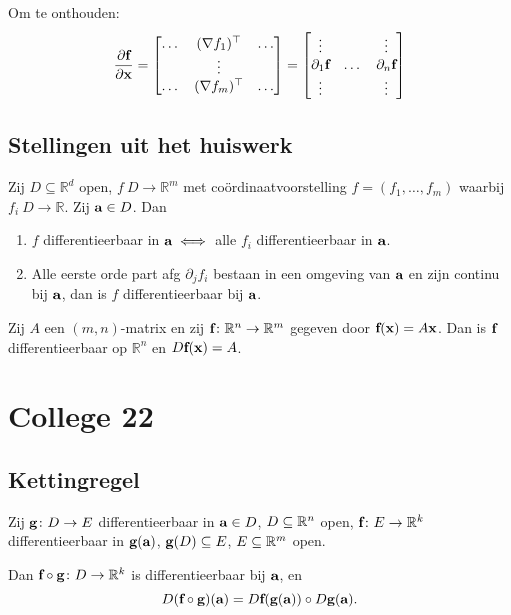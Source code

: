 \documentclass{2wa40summary}
\begin{document}
			Om te onthouden:
			\[ \frac{\partial {\textbf{f}}}{\partial {\textbf{x}}} = \begin{bmatrix}
			\dots & (\nabla f_1)^\top & \dots \\
			& \vdots & \\
			\dots & (\nabla f_m)^\top & \dots
			\end{bmatrix} =
			\begin{bmatrix}
			\vdots & & \vdots \\
			\partial_1 {\textbf{f}} & \dots & \partial_n {\textbf{f}} \\
			\vdots & & \vdots
			\end{bmatrix}\]
			
		\subsection{Stellingen uit het huiswerk}
			\theorem Zij $ D \subseteq \mathbb{R}^d $ open, $ f\:  D \to \mathbb{R}^m $ met co\"ordinaatvoorstelling $ f=(f_1,\dots,f_m) $ waarbij $ f_i \:  D \to \mathbb{R} $. Zij $ {\textbf{a}} \in D $. Dan
			\begin{enumerate}[(1)]
				\item $ f $ differentieerbaar in $ {\textbf{a}} \iff $ alle $ f_i $ differentieerbaar in $ {\textbf{a}} $.
				\item Alle eerste orde part afg $ \partial_j f_i $ bestaan in een omgeving van $ {\textbf{a}} $ en zijn continu bij $ {\textbf{a}} $, dan is $ f $ differentieerbaar bij $ {\textbf{a}} $.
			\end{enumerate}
			\theorem Zij $ A $ een $ (m,n) $-matrix en zij $ {\textbf{f}}\colon \mathbb{R}^n \to \mathbb{R}^m $ gegeven door $ {\textbf{f}}({\textbf{x}})=A{\textbf{x}} $. Dan is $ {\textbf{f}} $ differentieerbaar op $ \mathbb{R}^n $ en $ D{\textbf{f}}({\textbf{x}}) = A $.
			
	\newpage
	\section{College 22}
		\subsection{Kettingregel}
			\theorem Zij ${\textbf{g}}\colon D \to E$ differentieerbaar in ${\textbf{a}} \in D$, $D \subseteq \mathbb{R}^n$ open, ${\textbf{f}}\colon E \to \mathbb{R}^k$ differentieerbaar in ${\textbf{g}}({\textbf{a}})$, ${\textbf{g}}(D) \subseteq E$, $E \subseteq \mathbb{R}^m$ open.
			
			Dan ${\textbf{f}}\circ {\textbf{g}}\colon D\to \mathbb{R}^k$ is differentieerbaar bij ${\textbf{a}}$, en \[ D({\textbf{f}} \circ {\textbf{g}})({\textbf{a}}) = D{\textbf{f}}({\textbf{g}}({\textbf{a}}))\circ D{\textbf{g}}({\textbf{a}}). \]
			
\end{document}
